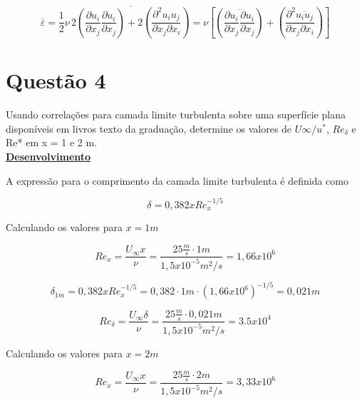\documentclass[12pt]{article}
\begin{document}
\begin{equation}
	\overline{\varepsilon} = \frac{1}{2} \nu \, \overline{2\left( \frac{\partial u_i}{\partial x_j}\frac{\partial u_i}{\partial x_j}  \right) + 2\left(  \frac{\partial ^2 u_i u_j}{\partial x_j \partial x_i} \right)} = \nu  \left[ \left( \overline{\frac{\partial u_i}{\partial x_j}\frac{\partial u_i}{\partial x_j}  }\right) + \left(  \frac{\partial ^2 \overline{u_i u_j}}{\partial x_j \partial x_i} \right)\right] 
\end{equation}

\section*{Questão 4}



Usando correlações para camada limite turbulenta sobre uma superfície plana disponíveis em livros texto da graduação, determine os valores de $U\infty/u^*$, $Re_\delta$ e Re* em x = 1 e 2 m.\\

\textbf{\underline{Desenvolvimento}}

A expressão para o comprimento da camada limite turbulenta é definida como

\begin{equation}
	\delta = 0,382 x Re_x^{-1/5}
\end{equation}


Calculando os valores para $x=1m$

\begin{equation}
	Re_x = \frac{U_\infty x}{\nu} = \frac{25 \frac{m}{s} \cdot 1m}{1,5 x 10 ^{-5} m^2 / s} = 1,66 x 10 ^ {6}
\end{equation}

\begin{equation}
	\delta_{1m}= 0,382 x Re_x^{-1/5} = 0,382 \cdot 1m \cdot(1,66 x 10 ^ {6})^{-1/5} = 0,021 m
\end{equation}

\begin{equation}
	Re_\delta = \frac{U_\infty \delta}{\nu} = \frac{25 \frac{m}{s} \cdot 0,021m}{1,5 x 10 ^{-5} m^2 / s} = 3.5 x 10 ^ 4
\end{equation}

Calculando os valores para $x=2m$

\begin{equation}
	Re_x = \frac{U_\infty x}{\nu} = \frac{25 \frac{m}{s} \cdot 2m}{1,5 x 10 ^{-5} m^2 / s} = 3,33 x 10 ^ {6}
\end{equation}
\end{document}
